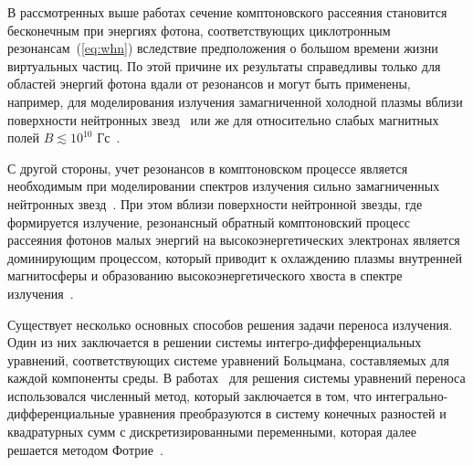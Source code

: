 \documentclass[14pt, russian]{article}
\begin{document}
В рассмотренных выше работах сечение комптоновского рассеяния 
становится бесконечным при энергиях фотона, соответствующих циклотронным 
резонансам~(\ref{eq:whn}) вследствие предположения о 
большом времени жизни виртуальных частиц. По этой причине их результаты 
справедливы только для областей энергий фотона вдали от резонансов
и могут быть применены, например, для моделирования излучения 
замагниченной 
холодной плазмы вблизи поверхности нейтронных 
звезд~\cite{Ozel:2001} или же для относительно слабых магнитных 
полей $B\lesssim 10^{10}$ Гс~\cite{Zavlin:1996}.

С другой стороны, учет резонансов в комптоновском процессе является необходимым 
при моделировании спектров излучения сильно замагниченных нейтронных 
звезд~\cite{Alexander:1991,Araya:1999,Ho:2001,Lyutikov:2006,Potekhin:2004,Schonherr:2007,Nishimura:2008,Suleimanov:2009}.
При этом вблизи поверхности нейтронной звезды, где формируется излучение, резонансный 
обратный комптоновский процесс рассеяния фотонов малых энергий на высокоэнергетических электронах 
является доминирующим процессом, который приводит к охлаждению плазмы 
внутренней магнитосферы и образованию высокоэнергетического хвоста в спектре 
излучения~\cite{Fernandez:2007,Nobili:2008,Baring:2018,Beloborodov:2013}.

Существует несколько основных способов решения задачи переноса излучения. Один из них заключается в решении системы интегро-дифференциальных уравнений, соответствующих системе уравнений Больцмана, составляемых для каждой компоненты среды. В работах~\cite{Alexander:1991,Nishimura:2008,Nagel:1981,Kaminker:1982,Meszaros:1985} для решения системы уравнений переноса использовался численный метод, который заключается в том, что интегрально-дифференциальные уравнения преобразуются в систему конечных разностей и квадратурных сумм с дискретизированными переменными, которая далее решается методом Фотрие~\cite{Mihalas:1985}.
\end{document}
